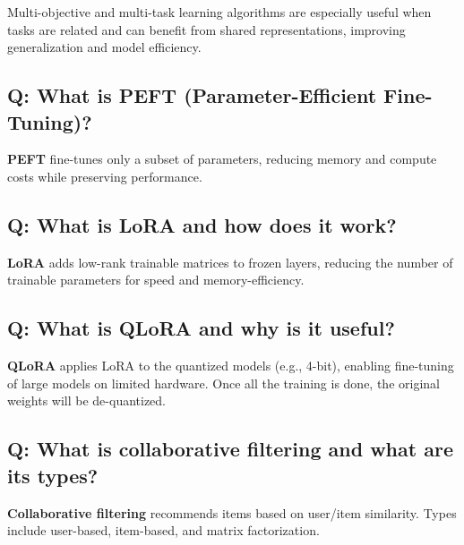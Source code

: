 \documentclass[11pt]{article}
\begin{document}
Multi-objective and multi-task learning algorithms are especially useful when tasks are related and can benefit from shared representations, improving generalization and model efficiency.

\subsection*{Q: What is PEFT (Parameter-Efficient Fine-Tuning)?}
\textbf{PEFT} fine-tunes only a subset of parameters, reducing memory and compute costs while preserving performance.

\subsection*{Q: What is LoRA and how does it work?}
\textbf{LoRA} adds low-rank trainable matrices to frozen layers, reducing the number of trainable parameters for speed and memory-efficiency.

\subsection*{Q: What is QLoRA and why is it useful?}
\textbf{QLoRA} applies LoRA to the quantized models (e.g., 4-bit), enabling fine-tuning of large models on limited hardware. Once all the training is done, the original weights will be de-quantized.

\subsection*{Q: What is collaborative filtering and what are its types?}
\textbf{Collaborative filtering} recommends items based on user/item similarity. Types include user-based, item-based, and matrix factorization.
\end{document}
